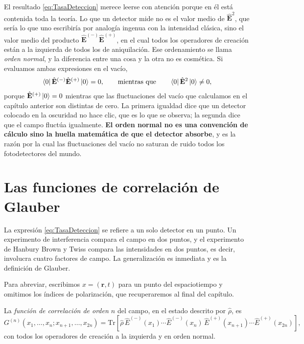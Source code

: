    El resultado \eqref{eq:TasaDeteccion} merece leerse con atención porque en él está contenida toda la teoría. Lo que un detector mide no es el valor medio de $\hat{\mathbf{E}}^{2}$, que sería lo que uno escribiría por analogía ingenua con la intensidad clásica, sino el valor medio del producto $\hat{\mathbf{E}}^{(-)}\hat{\mathbf{E}}^{(+)}$, en el cual todos los operadores de creación están a la izquierda de todos los de aniquilación. Ese ordenamiento se llama \textit{orden normal}, y la diferencia entre una cosa y la otra no es cosmética. Si evaluamos ambas expresiones en el vacío,
    \begin{equation}\label{eq:VacioDetector}
        \bra{0}\hat{\mathbf{E}}^{(-)}\hat{\mathbf{E}}^{(+)}\ket{0} = 0,
        \qquad\text{mientras que}\qquad
        \bra{0}\hat{\mathbf{E}}^{2}\ket{0} \neq 0,
    \end{equation}
    porque $\hat{\mathbf{E}}^{(+)}\ket{0}=0$ mientras que las fluctuaciones del vacío que calculamos en el capítulo anterior son distintas de cero. La primera igualdad dice que un detector colocado en la oscuridad no hace clic, que es lo que se observa; la segunda dice que el campo fluctúa igualmente. \textbf{El orden normal no es una convención de cálculo sino la huella matemática de que el detector absorbe}, y es la razón por la cual las fluctuaciones del vacío no saturan de ruido todos los fotodetectores del mundo.

\section{Las funciones de correlación de Glauber}

    La expresión \eqref{eq:TasaDeteccion} se refiere a un solo detector en un punto. Un experimento de interferencia compara el campo en dos puntos, y el experimento de Hanbury Brown y Twiss compara las intensidades en dos puntos, es decir, involucra cuatro factores de campo. La generalización es inmediata y es la definición de Glauber.

    Para abreviar, escribimos $x = (\mathbf{r},t)$ para un punto del espaciotiempo y omitimos los índices de polarización, que recuperaremos al final del capítulo.

    \begin{myDef}\label{def:GlauberN}
        La \textit{función de correlación de orden $n$} del campo, en el estado descrito por $\hat{\rho}$, es
        \begin{equation}\label{eq:GlauberN}
            G^{(n)}\left(x_{1},\ldots,x_{n};x_{n+1},\ldots,x_{2n}\right)
            = \mathrm{Tr}\left[\hat{\rho}\,\hat{E}^{(-)}(x_{1})\cdots\hat{E}^{(-)}(x_{n})\,\hat{E}^{(+)}(x_{n+1})\cdots\hat{E}^{(+)}(x_{2n})\right],
        \end{equation}
        con todos los operadores de creación a la izquierda y en orden normal.
    \end{myDef}

